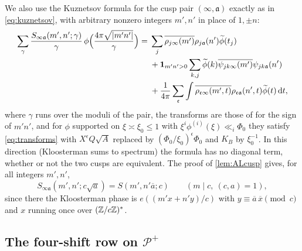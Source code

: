\documentclass[11pt,colorlinks]{charlie}
\begin{document}
We also use the Kuznetsov formula for the cusp pair $(\infty,\mathfrak a)$ exactly as in \eqref{eq:kuznetsov}, with arbitrary nonzero integers $m',n'$ in place of $1,\pm n$:
\begin{equation}\label{eq:kuzgeneral}
 \begin{split}
 \sum_\gamma\frac{S_{\infty\mathfrak a}(m',n';\gamma)}\gamma\,\phi\Big(\frac{4\pi\sqrt{|m'n'|}}\gamma\Big)={}&\sum_j\overline{\rho_{j\infty}(m')}\rho_{j\mathfrak a}(n')\widetilde\phi(t_j)\\
 &+\mathbf{1}_{m'n'>0}\sum_{k,j}\widetilde\phi(k)\overline{\psi_{jk\infty}(m')}\psi_{jk\mathfrak a}(n')\\
 &+\frac1{4\pi}\sum_{\mathfrak c}\int\overline{\rho_{\mathfrak c\infty}(m',t)}\rho_{\mathfrak c\mathfrak a}(n',t)\widetilde\phi(t)\,\mathrm{d} t,
 \end{split}
\end{equation}
where $\gamma$ runs over the moduli of the pair, the transforms are those of \cite[Theorem~1]{DI} for the sign of $m'n'$, and for $\phi$ supported on $\xi\asymp\xi_0\le1$ with $\xi^i\phi^{(i)}(\xi)\ll_i\Phi_0$ they satisfy \eqref{eq:transforms} with $X^\epsilon Q\sqrt A$ replaced by $(\Phi_0/\xi_0)^\epsilon\Phi_0$ and $K_B$ by $\xi_0^{-1}$. In this direction (Kloosterman sums to spectrum) the formula has no diagonal term, whether or not the two cusps are equivalent. The proof of \cref{lem:ALcusp} gives, for all integers $m',n'$,
\begin{equation}\label{eq:ALgeneral}
 S_{\infty\mathfrak a}(m',n';c\sqrt a)=S(m',n'\overline a;c)\qquad(m\mid c,\ (c,a)=1),
\end{equation}
since there the Kloosterman phase is $e((m'x+n'y)/c)$ with $y\equiv\overline a\,\overline x\pmod c$ and $x$ running once over $(\mathbb{Z}/c\mathbb{Z})^*$.

\subsection{The four-shift row on $\mathcal P^+$}
\end{document}
